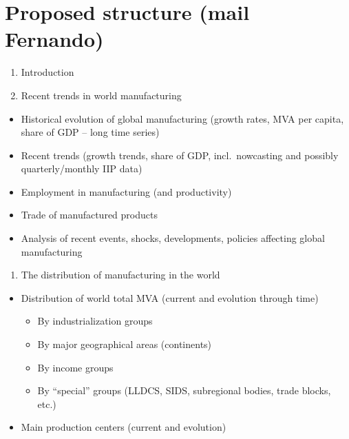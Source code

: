 \documentclass[
  openany, nofonts]{tufte-book}
\providecommand{\tightlist}{%
  \setlength{\itemsep}{0pt}\setlength{\parskip}{0pt}}
\begin{document}
\hypertarget{proposed-structure-mail-fernando}{%
\section*{Proposed structure (mail Fernando)}\label{proposed-structure-mail-fernando}}

\begin{enumerate}
\def\labelenumi{(\arabic{enumi})}
\tightlist
\item
  Introduction
\item
  Recent trends in world manufacturing
\end{enumerate}

\begin{itemize}
\tightlist
\item
  Historical evolution of global manufacturing (growth rates, MVA per capita, share of GDP -- long time series)
\item
  Recent trends (growth trends, share of GDP, incl.~nowcasting and possibly quarterly/monthly IIP data)
\item
  Employment in manufacturing (and productivity)
\item
  Trade of manufactured products
\item
  Analysis of recent events, shocks, developments, policies affecting global manufacturing
\end{itemize}

\begin{enumerate}
\def\labelenumi{(\arabic{enumi})}
\setcounter{enumi}{2}
\tightlist
\item
  The distribution of manufacturing in the world
\end{enumerate}

\begin{itemize}
\tightlist
\item
  Distribution of world total MVA (current and evolution through time)

  \begin{itemize}
  \tightlist
  \item
    By industrialization groups
  \item
    By major geographical areas (continents)
  \item
    By income groups
  \item
    By ``special'' groups (LLDCS, SIDS, subregional bodies, trade blocks, etc.)
  \end{itemize}
\item
  Main production centers (current and evolution)
\end{itemize}
\end{document}
